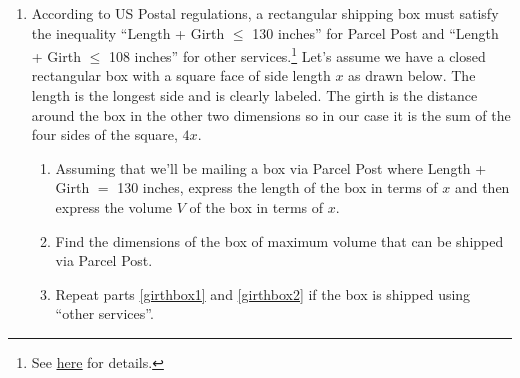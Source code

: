 \documentclass{ximera}
\begin{document}
\begin{enumerate}
\setcounter{enumi}{\value{HW}}

\item According to US Postal regulations, a rectangular shipping box must satisfy the inequality ``Length + Girth $\leq$ 130 inches'' for Parcel Post and ``Length + Girth $\leq$ 108 inches'' for other services.\footnote{See \href{http://www.usps.com/send/preparemailandpackages/measuringtips.htm}{\underline{here}} for details.}  Let's assume we have a closed rectangular box with a square face of side length $x$ as drawn below.  The length is the longest side and is clearly labeled.  The girth is the distance around the box in the other two dimensions so in our case it is the sum of the four sides of the square, $4x$.  

\begin{enumerate}

\item \label{girthbox1} Assuming that we'll be mailing a box via Parcel Post where Length + Girth $=$ 130 inches, express the length of the box in terms of $x$ and then express the volume $V$ of the box in terms of $x$.

\item \label{girthbox2} Find the dimensions of the box of maximum volume that can be shipped via Parcel Post.

\item Repeat parts \ref{girthbox1} and \ref{girthbox2} if the box is shipped using ``other services''.

\end{enumerate}

%
%

\setcounter{HW}{\value{enumi}}
\end{enumerate}
\end{document}
